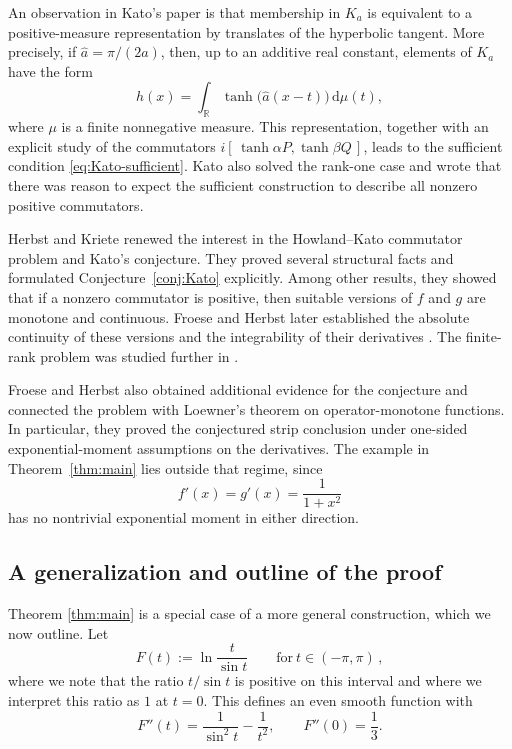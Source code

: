 \documentclass[11pt]{article}
\theoremstyle{definition}
\theoremstyle{remark}
\newcommand{\R}{\mathbb{R}}
\newcommand{\dd}{\,\mathrm{d}}
\begin{document}
An observation in Kato's paper is that membership in $K_a$ is equivalent to a positive-measure representation by translates of the hyperbolic tangent.  More precisely, if $\widehat a=\pi/(2a)$, then, up to an additive real constant, elements of $K_a$ have the form
\begin{equation}\label{eq:Kato-representation}
h(x)=\int_{\R}\tanh\bigl(\widehat a(x-t)\bigr)\dd\mu(t),
\end{equation}
where $\mu$ is a finite nonnegative measure.  This representation, together with an explicit study of the commutators $i[\,\tanh\alpha P,\tanh\beta Q\,]$, leads to the sufficient condition \eqref{eq:Kato-sufficient}.  Kato also solved the rank-one case and wrote that there was reason to expect the sufficient construction to describe all nonzero positive commutators.

Herbst and Kriete \cite{HerbstKriete} renewed the interest in the Howland--Kato commutator problem and Kato's conjecture. They proved several structural facts and formulated Conjecture~\ref{conj:Kato} explicitly.  Among other results, they showed that if a nonzero commutator is positive, then suitable versions of $f$ and $g$ are monotone and continuous. Froese and Herbst later established the absolute continuity of these versions and the integrability of their derivatives \cite[Theorem~1.1]{FroeseHerbst}.  The finite-rank problem was studied further in \cite{HerbstFiniteRank}.

Froese and Herbst \cite{FroeseHerbst} also obtained additional evidence for the conjecture and connected the problem with Loewner's theorem on operator-monotone functions.  In particular, they proved the conjectured strip conclusion under one-sided exponential-moment assumptions on the derivatives.  The example in Theorem~\ref{thm:main} lies outside that regime, since
\[
f'(x)=g'(x)=\frac{1}{1+x^2}
\]
has no nontrivial exponential moment in either direction.


\subsection*{A generalization and outline of the proof}

Theorem \ref{thm:main} is a special case of a more general construction, which we now outline. Let
\begin{equation}\label{eq:F-def}
F(t):=\ln\frac{t}{\sin t}
\qquad\text{for}\ t\in(-\pi,\pi) \,,
\end{equation}
where we note that the ratio $t/\sin t$ is positive on this interval and where we interpret this ratio as $1$ at $t=0$. This defines an even smooth function with
\begin{equation}\label{eq:Fpp}
F''(t)=\frac{1}{\sin^2t}-\frac{1}{t^2},
\qquad
F''(0)=\frac13.
\end{equation}
\end{document}
